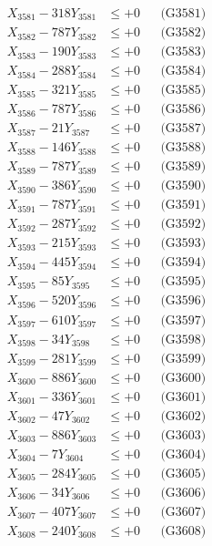 \documentclass[a4paper,10pt]{article}
\begin{document}
{\begin{align}
\allowbreak
X_{3581} - 318Y_{3581} &\leq +0 && \text{(G3581)} \\
X_{3582} - 787Y_{3582} &\leq +0 && \text{(G3582)} \\
X_{3583} - 190Y_{3583} &\leq +0 && \text{(G3583)} \\
X_{3584} - 288Y_{3584} &\leq +0 && \text{(G3584)} \\
X_{3585} - 321Y_{3585} &\leq +0 && \text{(G3585)} \\
X_{3586} - 787Y_{3586} &\leq +0 && \text{(G3586)} \\
X_{3587} - 21Y_{3587} &\leq +0 && \text{(G3587)} \\
X_{3588} - 146Y_{3588} &\leq +0 && \text{(G3588)} \\
X_{3589} - 787Y_{3589} &\leq +0 && \text{(G3589)} \\
X_{3590} - 386Y_{3590} &\leq +0 && \text{(G3590)} \\
\allowbreak
X_{3591} - 787Y_{3591} &\leq +0 && \text{(G3591)} \\
X_{3592} - 287Y_{3592} &\leq +0 && \text{(G3592)} \\
X_{3593} - 215Y_{3593} &\leq +0 && \text{(G3593)} \\
X_{3594} - 445Y_{3594} &\leq +0 && \text{(G3594)} \\
X_{3595} - 85Y_{3595} &\leq +0 && \text{(G3595)} \\
X_{3596} - 520Y_{3596} &\leq +0 && \text{(G3596)} \\
X_{3597} - 610Y_{3597} &\leq +0 && \text{(G3597)} \\
X_{3598} - 34Y_{3598} &\leq +0 && \text{(G3598)} \\
X_{3599} - 281Y_{3599} &\leq +0 && \text{(G3599)} \\
X_{3600} - 886Y_{3600} &\leq +0 && \text{(G3600)} \\
\allowbreak
X_{3601} - 336Y_{3601} &\leq +0 && \text{(G3601)} \\
X_{3602} - 47Y_{3602} &\leq +0 && \text{(G3602)} \\
X_{3603} - 886Y_{3603} &\leq +0 && \text{(G3603)} \\
X_{3604} - 7Y_{3604} &\leq +0 && \text{(G3604)} \\
X_{3605} - 284Y_{3605} &\leq +0 && \text{(G3605)} \\
X_{3606} - 34Y_{3606} &\leq +0 && \text{(G3606)} \\
X_{3607} - 407Y_{3607} &\leq +0 && \text{(G3607)} \\
X_{3608} - 240Y_{3608} &\leq +0 && \text{(G3608)} \\

\end{align}}
\end{document}
